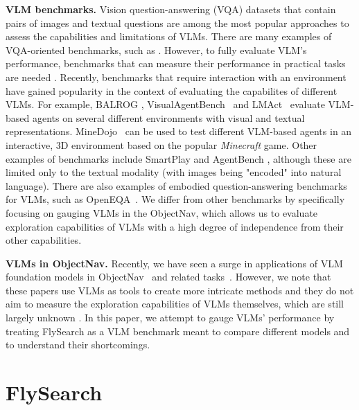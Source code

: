 \documentclass{article}
\theoremstyle{plain}
\theoremstyle{definition}
\theoremstyle{remark}
\newcommand{\ours}{FlySearch}
\newcommand{\objectnav}{ObjectNav}
\begin{document}
\textbf{VLM benchmarks.} Vision question-answering (VQA) datasets that contain pairs of images and textual questions are among the most popular approaches to assess the capabilities and limitations of VLMs. There are many examples of VQA-oriented benchmarks, such as \cite{goyal2017making, hudson2019gqa, liu2025mmbench, marino2019ok, singh2019towards, yu2023mm}. However, to fully evaluate VLM's performance, benchmarks that can measure their performance in practical tasks are needed \cite{huang2024survey, li2024survey}.
Recently, benchmarks that require interaction with an environment have gained popularity in the context of evaluating the capabilites of different VLMs. For example, BALROG \cite{paglieri2024balrog}, VisualAgentBench~\cite{liu2024visualagentbench} and LMAct~\cite{ruoss2025lmact} evaluate VLM-based agents on several different environments with visual and textual representations. MineDojo~\cite{fan2022minedojo} can be used to test different VLM-based agents in an interactive, 3D environment based on the popular \textit{Minecraft} game. Other examples of benchmarks include SmartPlay \cite{wu2023smartplay} and AgentBench \cite{liu2023agentbench}, although these are limited only to the textual modality (with images being "encoded" into natural language). There are also examples of embodied question-answering benchmarks for VLMs, such as OpenEQA~\cite{majumdar2024openeqa}. We differ from other benchmarks by specifically focusing on gauging VLMs in the \objectnav{}, which allows us to evaluate exploration capabilities of VLMs with a high degree of independence from their other capabilities.

\textbf{VLMs in \objectnav{}.} Recently, we have seen a surge in applications of VLM foundation models in \objectnav{}~\cite{cai2024bridging, cai2025cl, dorbala2023can,kuang2024openfmnav,yu2023l3mvn} and related tasks~\cite{long2024instructnav, wu2024camon, zhou2024navgpt}. However, we note that these papers use VLMs as tools to create more intricate methods and they do not aim to measure the exploration capabilities of VLMs themselves, which are still largely unknown \cite{sun2024survey}. In this paper, we attempt to gauge VLMs' performance by treating \ours{} as a VLM benchmark meant to compare different models and to understand their shortcomings.

\section{\ours{}}
\label{sec:method}
\end{document}
